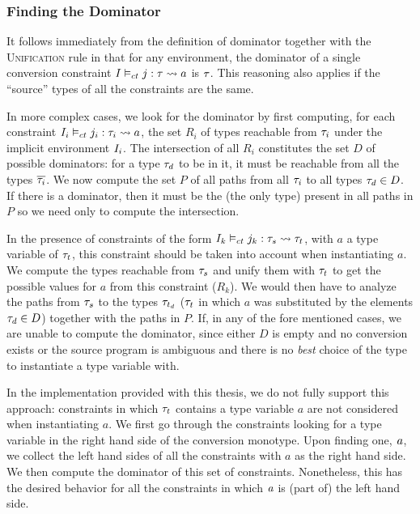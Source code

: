 \subsubsection{Finding the Dominator}
It follows immediately from the definition of dominator together with the \textsc{Unification} rule in  that for any environment, the dominator of a single conversion constraint ${I} \vDash_{ct} {j}: {\mathit{\tau}} \rightsquigarrow {a}$ is $\mathit{\tau}$. This reasoning also applies if the ``source'' types of all the constraints are the same.

In more complex cases, we look for the dominator by first computing, for each constraint ${I_i} \vDash_{ct} {j_i}: {\mathit{\tau}_{i}} \rightsquigarrow {a}$, the set $R_i$ of types reachable from $\mathit{\tau}_i$ under the implicit environment $I_i$. The intersection of all $R_i$ constitutes the set $D$ of possible dominators: for a type $\mathit{\tau}_d$ to be in it, it must be reachable from all the types $\overline{\mathit{\tau}_{i}}$. We now compute the set $P$ of all paths from all $\mathit{\tau}_i$ to all types $\mathit{\tau}_d \in D$. If there is a dominator, then it must be the (the only type) present in all paths in $P$ so we need only to compute the intersection.

In the presence of constraints of the form ${I_k} \vDash_{ct} {j_k}: {\mathit{\tau}_s} \rightsquigarrow {\mathit{\tau}_t}$, with $a$ a type variable of $\mathit{\tau}_t$, this constraint should be taken into account when instantiating $a$. We compute the types reachable from $\mathit{\tau}_s$ and unify them with $\mathit{\tau}_t$ to get the possible values for $a$ from this constraint ($R_k$). We would then have to analyze the paths from $\mathit{\tau}_s$ to the types $\mathit{\tau}_{t_d}$ ($\mathit{\tau}_t$ in which $a$ was substituted by the elements $\mathit{\tau}_d \in D$) together with the paths in $P$. If, in any of the fore mentioned cases, we are unable to compute the dominator, since either $D$ is empty and no conversion exists or the source program is ambiguous and there is no \textit{best} choice of the type to instantiate a type variable with.

In the implementation provided with this thesis, we do not fully support this approach: constraints in which $\mathit{\tau}_t$ contains a type variable $a$ are not considered when instantiating $a$. We first go through the constraints looking for a type variable in the right hand side of the conversion monotype. Upon finding one, $\mathit{a}$, we collect the left hand sides of all the constraints with $a$ as the right hand side. We then compute the dominator of this set of constraints. Nonetheless, this has the desired behavior for all the constraints in which $\mathit{a}$ is (part of) the left hand side.

